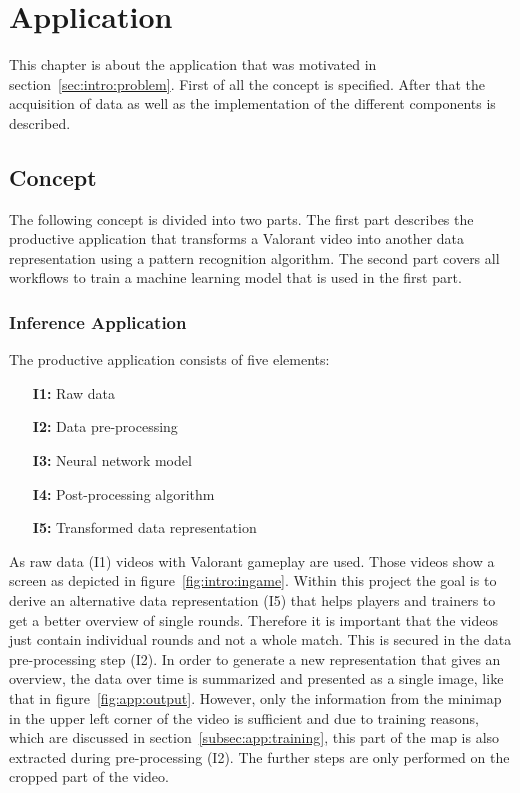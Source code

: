 \chapter{Application}\label{chpt:application}
\glsresetall

This chapter is about the application that was motivated in section~\ref{sec:intro:problem}. First of 
all the concept is specified. After that the acquisition of data as well as the implementation of the 
different components is described.

\section{Concept}\label{sec:app:concept}

The following concept is divided into two parts. The first part describes the productive application 
that transforms a Valorant video into another data representation using a pattern recognition 
algorithm. The second part covers all workflows to train a machine learning model that is used in the 
first part.

\subsection{Inference Application}\label{subsec:app:inference}

The productive application consists of five elements:

\begin{itemize}
	\item[\textbf{I1:}] Raw data
	\item[\textbf{I2:}] Data pre-processing
	\item[\textbf{I3:}] Neural network model
	\item[\textbf{I4:}] Post-processing algorithm
	\item[\textbf{I5:}] Transformed data representation
\end{itemize}

As raw data (I1) videos with Valorant gameplay are used. Those videos show a screen as depicted in 
figure~\ref{fig:intro:ingame}. Within this project the goal is to derive an alternative data 
representation (I5) that helps players and trainers to get a better overview of single rounds. 
Therefore it is important that the videos just contain individual rounds and not a whole match. This is 
secured in the data pre-processing step (I2). In order to generate a new representation that gives an 
overview, the data over time is summarized and presented as a single image, like that in 
figure~\ref{fig:app:output}. However, only the information from the minimap in the upper left corner 
of the video is sufficient and due to training reasons, which are discussed in 
section~\ref{subsec:app:training}, this part of the map is also extracted during pre-processing (I2). 
The further steps are only performed on the cropped part of the video.

